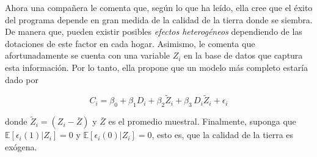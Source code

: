 \documentclass[a4paper]{article}
\begin{document}
Ahora una compañera le comenta que, según lo que ha leído, ella cree que el éxito del programa depende en gran medida de la calidad de la tierra donde se siembra. De manera que, pueden existir posibles \emph{efectos heterogéneos} dependiendo de las dotaciones de este factor en cada hogar. Asimismo, le comenta que afortunadamente se cuenta con una variable $Z_i$ en la base de datos que captura esta información. Por lo tanto, ella propone que un modelo más completo estaría dado por


\begin{equation}\label{eq: ref2}
C_i=\beta_0+\beta_1 D_i +\beta_2 \tilde{Z}_i+\beta_3 \, D_i  \tilde{Z}_i+\epsilon_i    
\end{equation}

donde $\tilde{Z}_i=(Z_i-\bar{Z})$ y $\bar{Z}$ es el promedio muestral. Finalmente, suponga que $\mathbb{E}[\epsilon_i(1)|Z_i]=0$ y $\mathbb{E}[\epsilon_i(0)|Z_i]=0$, esto es, que la calidad de la tierra es exógena.\\
\end{document}
